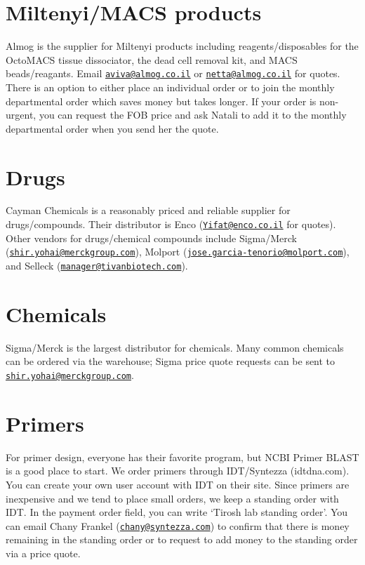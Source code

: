 \documentclass[]{book}
\begin{document}
\section{Miltenyi/MACS products}\label{miltenyimacs-products}

Almog is the supplier for Miltenyi products including
reagents/disposables for the OctoMACS tissue dissociator, the dead cell
removal kit, and MACS beads/reagants. Email
\href{mailto:aviva@almog.co.il}{\nolinkurl{aviva@almog.co.il}} or
\href{mailto:netta@almog.co.il}{\nolinkurl{netta@almog.co.il}} for
quotes. There is an option to either place an individual order or to
join the monthly departmental order which saves money but takes longer.
If your order is non-urgent, you can request the FOB price and ask
Natali to add it to the monthly departmental order when you send her the
quote.

\section{Drugs}\label{drugs}

Cayman Chemicals is a reasonably priced and reliable supplier for
drugs/compounds. Their distributor is Enco
(\href{mailto:Yifat@enco.co.il}{\nolinkurl{Yifat@enco.co.il}} for
quotes). Other vendors for drugs/chemical compounds include Sigma/Merck
(\href{mailto:shir.yohai@merckgroup.com}{\nolinkurl{shir.yohai@merckgroup.com}}),
Molport
(\href{mailto:jose.garcia-tenorio@molport.com}{\nolinkurl{jose.garcia-tenorio@molport.com}}),
and Selleck
(\href{mailto:manager@tivanbiotech.com}{\nolinkurl{manager@tivanbiotech.com}}).

\section{Chemicals}\label{chemicals}

Sigma/Merck is the largest distributor for chemicals. Many common
chemicals can be ordered via the warehouse; Sigma price quote requests
can be sent to
\href{mailto:shir.yohai@merckgroup.com}{\nolinkurl{shir.yohai@merckgroup.com}}.

\section{Primers}\label{primers}

For primer design, everyone has their favorite program, but NCBI Primer
BLAST is a good place to start. We order primers through IDT/Syntezza
(idtdna.com). You can create your own user account with IDT on their
site. Since primers are inexpensive and we tend to place small orders,
we keep a standing order with IDT. In the payment order field, you can
write `Tirosh lab standing order'. You can email Chany Frankel
(\href{mailto:chany@syntezza.com}{\nolinkurl{chany@syntezza.com}}) to
confirm that there is money remaining in the standing order or to
request to add money to the standing order via a price quote.
\end{document}

